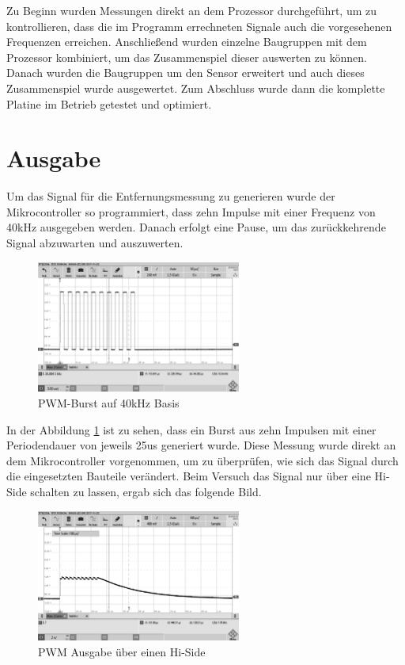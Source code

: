 
Zu Beginn wurden Messungen direkt an dem Prozessor durchgeführt, um zu kontrollieren, dass die im Programm errechneten Signale auch die vorgesehenen Frequenzen erreichen. Anschließend wurden einzelne Baugruppen mit dem Prozessor kombiniert, um das Zusammenspiel dieser auswerten zu können. Danach wurden die Baugruppen um den Sensor erweitert und auch dieses Zusammenspiel wurde ausgewertet. Zum Abschluss wurde dann die komplette Platine im Betrieb getestet und optimiert.

\section{Ausgabe}
Um das Signal für die Entfernungsmessung zu generieren wurde der Mikrocontroller so programmiert, dass zehn Impulse mit einer Frequenz von 40kHz ausgegeben werden. Danach erfolgt eine Pause, um das zurückkehrende Signal abzuwarten und auszuwerten.\\
\begin{figure}[H]
\includegraphics[width=0.6\textwidth, draft]{Abbildungen/PWM-von der cpu.png}
\caption{PWM-Burst auf 40kHz Basis}
\label{fig:pwm-burst}
\end{figure}
In der Abbildung \ref{fig:pwm-burst} ist zu sehen, dass ein Burst aus zehn Impulsen mit einer Periodendauer von jeweils 25us generiert wurde. Diese Messung wurde direkt an dem Mikrocontroller vorgenommen, um zu überprüfen, wie sich das Signal durch die eingesetzten Bauteile verändert.
Beim Versuch das Signal nur über eine Hi-Side schalten zu lassen, ergab sich das folgende Bild.
\begin{figure}[H]
\includegraphics[width=0.6\textwidth, draft]{Abbildungen/PWM ausgabe mit Hi-Side.png}\caption{PWM Ausgabe über einen Hi-Side}\label{fig:HiSide}
\end{figure}
